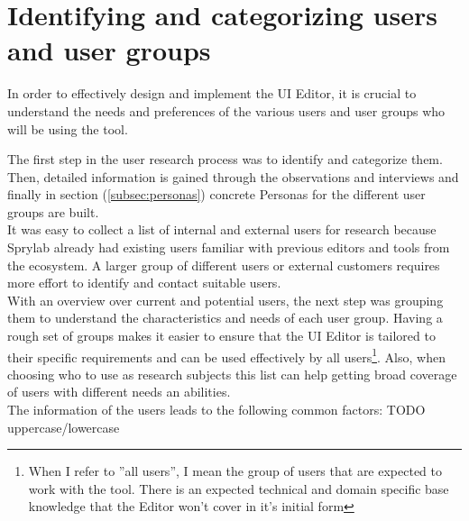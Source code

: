 \section{Identifying and categorizing users and user groups}
\label{sec:user-groups}
In order to effectively design and implement the UI Editor, it is crucial to understand the needs and preferences of the various users and user groups who will be using the tool.

The first step in the user research process was to identify and categorize them.
Then, detailed information is gained through the observations and interviews and finally in section (\ref{subsec:personas}) concrete Personas for the different user groups are built.
\\
It was easy to collect a list of internal and external users for research because Sprylab already had existing users familiar with previous editors and tools from the ecosystem.
A larger group of different users or external customers requires more effort to identify and contact suitable users.
\\
With an overview over current and potential users, the next step was grouping them to understand the characteristics and needs of each user group.
Having a rough set of groups makes it easier to ensure that the UI Editor is tailored to their specific requirements and can be used effectively by all users\footnote{When I refer to ''all users'', I mean the group of users that are expected to work with the tool. There is an expected technical and domain specific base knowledge that the Editor won't cover in it's initial form}.
Also, when choosing who to use as research subjects this list can help getting broad coverage of users with different needs an abilities.
\\
The information of the users leads to the following common factors:
TODO uppercase/lowercase
